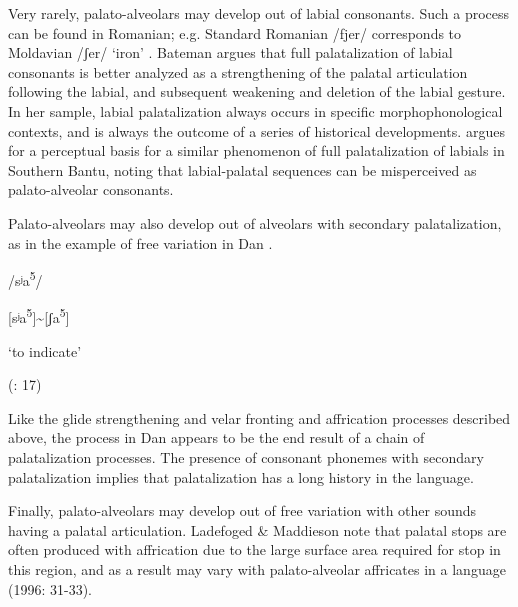   Very rarely, palato-alveolars may develop out of labial consonants. Such a process can be found in Romanian; e.g. Standard Romanian /fjer/ corresponds to Moldavian /ʃer/ ‘iron’ \citep[108]{Bateman2007}. Bateman argues that full palatalization of labial consonants is better analyzed as a strengthening of the palatal articulation following the labial, and subsequent weakening and deletion of the labial gesture. In her sample, labial palatalization always occurs in specific morphophonological contexts, and is always the outcome of a series of historical developments. \citet{Ohala1978} argues for a perceptual basis for a similar phenomenon of full palatalization of labials in Southern Bantu, noting that labial-palatal sequences can be misperceived as palato-alveolar consonants.

  Palato-alveolars may also develop out of alveolars with secondary palatalization, as in the example of free variation in Dan .

\ea\label{ex:(4.38)}

/sʲa\textsuperscript{5}/

[sʲa\textsuperscript{5}]{\textasciitilde}[ʃa\textsuperscript{5}]

\glt ‘to indicate’

(\citealt{BearthZemp1967}: 17)

\z

Like the glide strengthening and velar fronting and affrication processes described above, the process in Dan appears to be the end result of a chain of palatalization processes. The presence of consonant phonemes with secondary palatalization implies that palatalization has a long history in the language.

  Finally, palato-alveolars may develop out of free variation with other sounds having a palatal articulation. Ladefoged \& Maddieson note that palatal stops are often produced with affrication due to the large surface area required for stop in this region, and as a result may vary with palato-alveolar affricates in a language (1996: 31-33).

